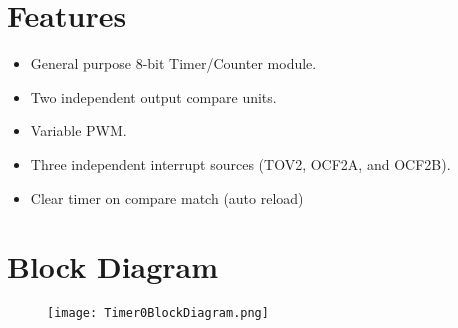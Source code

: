\documentclass{article}
\begin{document}

\section{Features}
\begin{itemize}
    \item General purpose 8-bit Timer/Counter module.
    \item Two independent output compare units.
    \item Variable PWM.
    \item Three independent interrupt sources (TOV2, OCF2A, and OCF2B).
    \item Clear timer on compare match (auto reload)
\end{itemize}

\section{Block Diagram}
\begin{figure}[H]
    \begin{center}
        \texttt{[image: Timer0BlockDiagram.png]}
    \end{center}
\end{figure}
\end{document}
